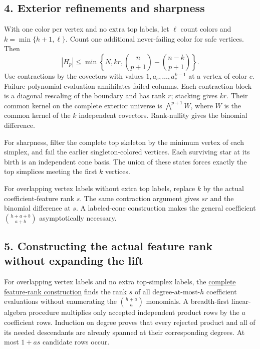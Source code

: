 \hypertarget{af-ca17aac320-exterior-refinements-and-sharpness}{%
\subsection{4. Exterior refinements and sharpness}\label{af-ca17aac320-exterior-refinements-and-sharpness}}

With one color per vertex and no extra top labels, let \(\ell\) count colors and \(k=\min\{h+1,\ell\}\). Count one additional never-failing color for safe vertices. Then \[
|H_p|\le\min\left\{N,kr,\binom n{p+1}-\binom{n-k}{p+1}\right\}.
\] Use contractions by the covectors with values \(1,a_c,\ldots,a_c^{k-1}\) at a vertex of color \(c\). Failure-polynomial evaluation annihilates failed columns. Each contraction block is a diagonal rescaling of the boundary and has rank \(r\); stacking gives \(kr\). Their common kernel on the complete exterior universe is \(\bigwedge^{p+1}W\), where \(W\) is the common kernel of the \(k\) independent covectors. Rank-nullity gives the binomial difference.

For sharpness, filter the complete top skeleton by the minimum vertex of each simplex, and fail the earlier singleton-colored vertices. Each surviving star at its birth is an independent cone basis. The union of these states forces exactly the top simplices meeting the first \(k\) vertices.

For overlapping vertex labels without extra top labels, replace \(k\) by the actual coefficient-feature rank \(s\). The same contraction argument gives \(sr\) and the binomial difference at \(s\). A labeled-cone construction makes the general coefficient \(\binom{h+a+b}{a+b}\) asymptotically necessary.

\hypertarget{af-ca17aac320-constructing-the-actual-feature-rank-without-expanding-the-lift}{%
\subsection{5. Constructing the actual feature rank without expanding the lift}\label{af-ca17aac320-constructing-the-actual-feature-rank-without-expanding-the-lift}}

For overlapping vertex labels and no extra top-simplex labels, the \href{https://github.com/icekylinx/algorithm-frontier/blob/main/problems/persistence-failure-certificates/manuscripts/feature-rank-construction.md}{complete feature-rank construction} finds the rank \(s\) of all degree-at-most-\(h\) coefficient evaluations without enumerating the \(\binom{h+a}{a}\) monomials. A breadth-first linear-algebra procedure multiplies only accepted independent product rows by the \(a\) coefficient rows. Induction on degree proves that every rejected product and all of its needed descendants are already spanned at their corresponding degrees. At most \(1+as\) candidate rows occur.


